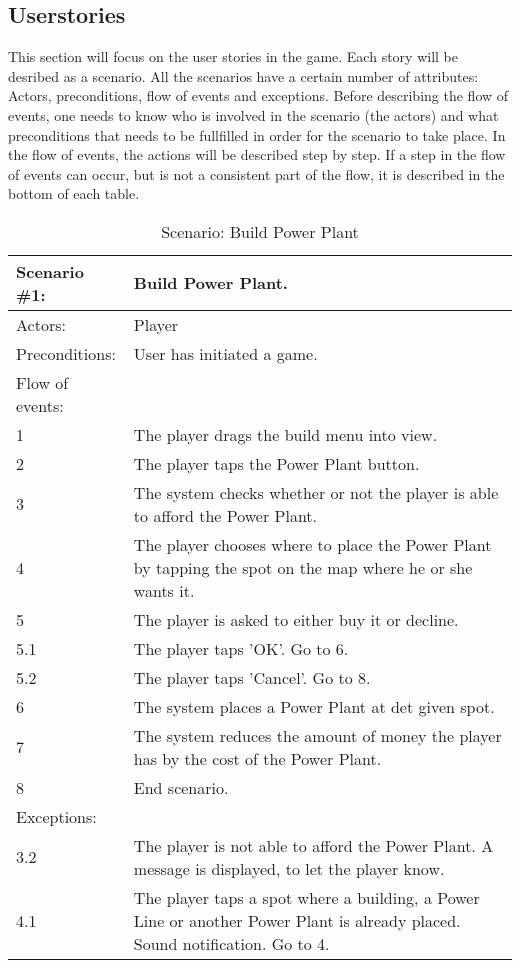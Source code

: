 \subsection{Userstories}

This section will focus on the user stories in the game. Each story will be desribed as a scenario. All the scenarios have a certain number of attributes: Actors, preconditions, flow of events and exceptions. Before describing the flow of events, one needs to know who is involved in the scenario (the actors) and what preconditions that needs to be fullfilled in order for the scenario to take place. In the flow of events, the actions will be described step by step. If a step in the flow of events can occur, but is not a consistent part of the flow, it is described in the bottom of each table.\\


\begin{table}
	\begin{tabular}{| l | p{10cm} |}
		\hline
		\rowcolor{lightgray}
		{\bf Scenario \#1:} & {\bf Build Power Plant.} \\ \hline
		Actors: & Player \\ \hline
		Preconditions: & User has initiated a game. \\ \hline
		Flow of events: &  \\ \hline
		1 & The player drags the build menu into view. \\ \hline
		2 & The player taps the Power Plant button. \\ \hline
		3 & The system checks whether or not the player is able to afford the Power Plant. \\ \hline
		4 & The player chooses where to place the Power Plant by tapping the spot on the map where he or she wants it. \\ \hline
		5 & The player is asked to either buy it or decline. \\ \hline
		5.1 & The player taps 'OK'. Go to 6. \\ \hline
		5.2 & The player taps 'Cancel'. Go to 8. \\ \hline
		6 & The system places a Power Plant at det given spot. \\ \hline
		7 & The system reduces the amount of money the player has by the cost of the Power Plant. \\ \hline
		8 & End scenario. \\ \hline
		Exceptions: & \\ \hline
		3.2 & The player is not able to afford the Power Plant. A message is displayed, to let the player know. \\ \hline
		4.1 & The player taps a spot where a building, a Power Line or another Power Plant is already placed. Sound notification. Go to 4. \\ \hline
	\end{tabular}
\caption{Scenario: Build Power Plant}
\end{table}

